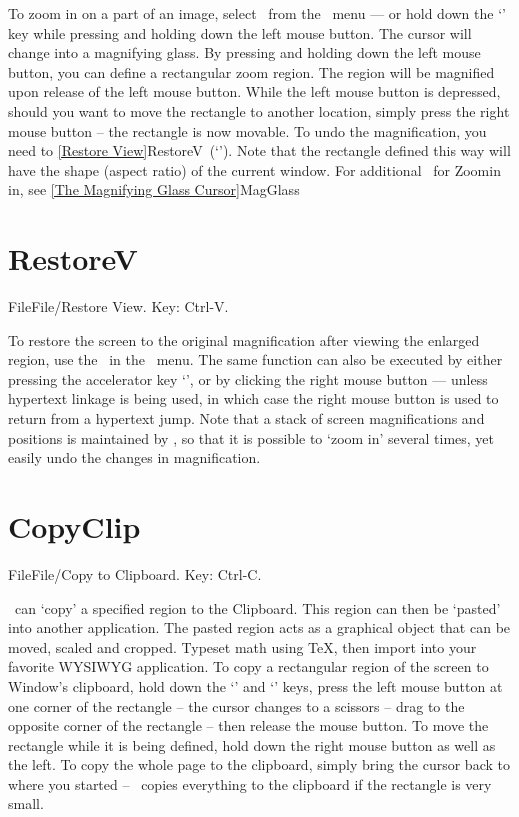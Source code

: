 To zoom in on a part of an image, select \ from the
\ menu --- or hold down the `' key while pressing
and holding down the left mouse button.  
The cursor will change into a magnifying glass.  
By pressing and holding down the left mouse button, you can define a
rectangular zoom region.  The region will be magnified upon release of
the left mouse button.  While the left mouse button is depressed,
should you want to move the rectangle to another location, simply press
the right mouse button -- the rectangle is now movable.  To undo the
magnification, you need to \ref{Restore View}{RestoreV}\ 
(`').
   \medskip
Note that the rectangle defined this way will have the shape (aspect
ratio) of the current window.
   \medskip
For additional \ for Zoomin in, see 
\ref{The Magnifying Glass Cursor}{MagGlass}
   \bigskip


\section{RestoreV}{File}File/Restore View. Key: Ctrl-V.

To restore the screen to the original magnification after viewing the
enlarged region, use the \hb{Restore View}\ in the \hb{File}\ menu.  The
same function can also be executed by either pressing the accelerator
key `\key{Ctrl-V}', or  by clicking the right mouse button
--- unless hypertext linkage is being used, in which case the right
mouse button is used to return from a hypertext jump.
    \medskip
Note that a stack of screen magnifications and positions is maintained
by \hb{DVIWindo}, so that it is possible to `zoom in' several times, yet
easily undo the changes in magnification.


\newpage

\section{CopyClip}{File}File/Copy to Clipboard. Key: Ctrl-C. %

\ can `copy' a specified region to the Clipboard.  This
region can then be `pasted' into another application.  The pasted region
acts as a graphical object that can be moved, scaled and cropped.  Typeset
math using \TeX, then import into your favorite WYSIWYG application.
   \bigskip
To copy a rectangular region of the screen to Window's clipboard, hold
down the `\key{Shift}' and `\key{Ctrl}' keys, press the left mouse
button at one corner of the rectangle -- the cursor changes to a
scissors -- drag to the opposite corner of the rectangle -- then release
the mouse button.  To move the rectangle while it is being defined, hold
down the right mouse button as well as the left.  To copy the whole page
to the clipboard, simply bring the cursor back to where you started --
\hb{DVIWindo}\ copies everything to the clipboard if the rectangle is very
small.
   \bigskip

